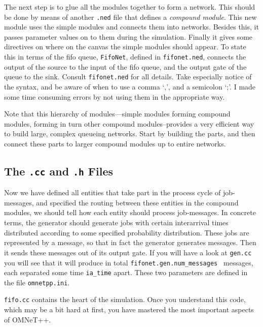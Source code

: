 \documentclass[a4paper]{article}
\begin{document}
The next step is to glue all the modules together to form a network.
This should be done by means of another \texttt{.ned} file that
defines a \emph{compound module}. This new module uses the simple
modules and connects them into networks. Besides this, it passes
parameter values on to them during the simulation. Finally it gives
some directives on where on the canvas the simple modules should
appear. To state this in terms of the fifo queue, \texttt{FifoNet},
defined in \texttt{fifonet.ned}, connects the output of the source to
the input of the fifo queue, and the output gate of the queue to the
sink. Consult \texttt{fifonet.ned} for all details. Take especially
notice of the syntax, and be aware of when to use a comma `,', and a
semicolon `;'. I made some time consuming errors by not using them in
the appropriate way.

Note that this hierarchy of
modules---simple modules forming compound modules, forming in turn
other compound modules--provides a very efficient way to build large,
complex queueing networks. Start by building the parts, and then
connect these parts to larger compound modules up to entire networks.

\subsection{The \texttt{.cc} and \texttt{.h} Files}
\label{sec:texttt.cc-texttt.h-f}
Now we have defined all entities that take part in the process cycle
of job-messages, and specified the routing between these entities in
the compound modules, we should tell how each entity should process
job-messages. In concrete terms, the generator should generate jobs
with certain interarrival times distributed according to some
specified probability distribution. These jobs are represented by a
message, so that in fact the generator generates messages. Then it
sends these messages out of its output gate. If you will have a look
at \texttt{gen.cc} you will see that it will produce in total
\texttt{fifonet.gen.num\_messages } messages, each separated some time
\texttt{ia\_time} apart. These two parameters are defined in the file
\texttt{omnetpp.ini}.

\texttt{fifo.cc} contains the heart of the simulation. Once you
understand this code, which may be a bit hard at first, you have
mastered the most important aspects of OMNeT++.
\end{document}
